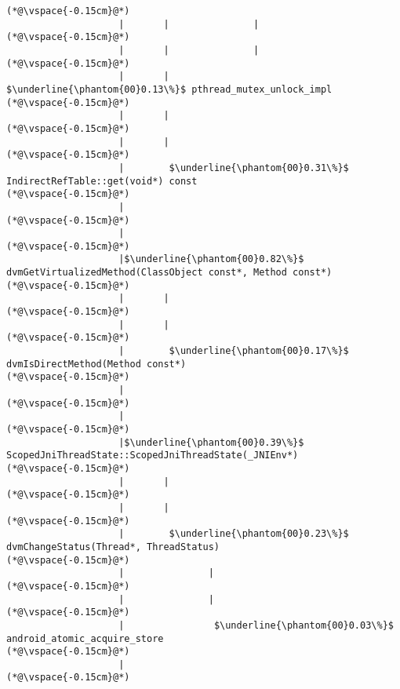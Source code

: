 \begin{lstlisting}[caption=20 viiteparametria (C$\to$Java) , label=profile:C2JBenchmark00206, numberbychapter=true, frame=lines]
(*@\vspace{-0.15cm}@*)
                    |       |               |
(*@\vspace{-0.15cm}@*)
                    |       |               |
(*@\vspace{-0.15cm}@*)
                    |       |                $\underline{\phantom{00}0.13\%}$ pthread_mutex_unlock_impl
(*@\vspace{-0.15cm}@*)
                    |       |
(*@\vspace{-0.15cm}@*)
                    |       |
(*@\vspace{-0.15cm}@*)
                    |        $\underline{\phantom{00}0.31\%}$ IndirectRefTable::get(void*) const
(*@\vspace{-0.15cm}@*)
                    |
(*@\vspace{-0.15cm}@*)
                    |
(*@\vspace{-0.15cm}@*)
                    |$\underline{\phantom{00}0.82\%}$ dvmGetVirtualizedMethod(ClassObject const*, Method const*)
(*@\vspace{-0.15cm}@*)
                    |       |
(*@\vspace{-0.15cm}@*)
                    |       |
(*@\vspace{-0.15cm}@*)
                    |        $\underline{\phantom{00}0.17\%}$ dvmIsDirectMethod(Method const*)
(*@\vspace{-0.15cm}@*)
                    |
(*@\vspace{-0.15cm}@*)
                    |
(*@\vspace{-0.15cm}@*)
                    |$\underline{\phantom{00}0.39\%}$ ScopedJniThreadState::ScopedJniThreadState(_JNIEnv*)
(*@\vspace{-0.15cm}@*)
                    |       |
(*@\vspace{-0.15cm}@*)
                    |       |
(*@\vspace{-0.15cm}@*)
                    |        $\underline{\phantom{00}0.23\%}$ dvmChangeStatus(Thread*, ThreadStatus)
(*@\vspace{-0.15cm}@*)
                    |               |
(*@\vspace{-0.15cm}@*)
                    |               |
(*@\vspace{-0.15cm}@*)
                    |                $\underline{\phantom{00}0.03\%}$ android_atomic_acquire_store
(*@\vspace{-0.15cm}@*)
                    |
(*@\vspace{-0.15cm}@*)

\end{lstlisting}
